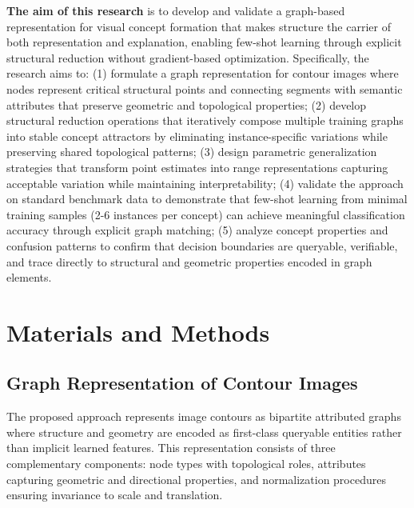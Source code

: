 \documentclass[a4paper,10pt]{article}
\begin{document}
\textbf{The aim of this research} is to develop and validate a graph-based representation for visual concept formation that makes structure the carrier of both representation and explanation, enabling few-shot learning through explicit structural reduction without gradient-based optimization. Specifically, the research aims to: (1) formulate a graph representation for contour images where nodes represent critical structural points and connecting segments with semantic attributes that preserve geometric and topological properties; (2) develop structural reduction operations that iteratively compose multiple training graphs into stable concept attractors by eliminating instance-specific variations while preserving shared topological patterns; (3) design parametric generalization strategies that transform point estimates into range representations capturing acceptable variation while maintaining interpretability; (4) validate the approach on standard benchmark data to demonstrate that few-shot learning from minimal training samples (2-6 instances per concept) can achieve meaningful classification accuracy through explicit graph matching; (5) analyze concept properties and confusion patterns to confirm that decision boundaries are queryable, verifiable, and trace directly to structural and geometric properties encoded in graph elements.

\section{Materials and Methods}

\subsection{Graph Representation of Contour Images}

The proposed approach represents image contours as bipartite attributed graphs where structure and geometry are encoded as first-class queryable entities rather than implicit learned features. This representation consists of three complementary components: node types with topological roles, attributes capturing geometric and directional properties, and normalization procedures ensuring invariance to scale and translation.
\end{document}
